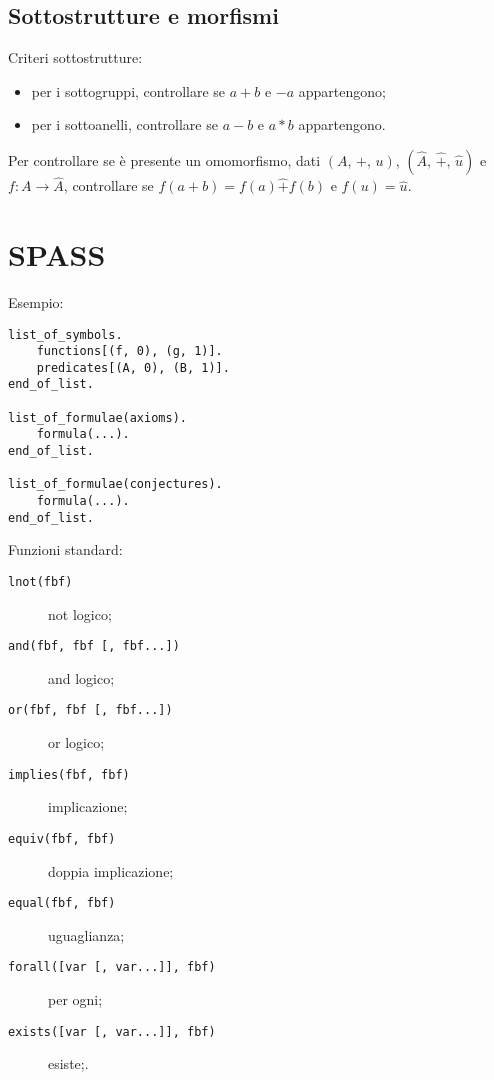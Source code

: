 \documentclass[10pt]{article}
\begin{document}
        \subsection*{Sottostrutture e morfismi}

            Criteri sottostrutture:
            \begin{itemize}
                \item per i sottogruppi, controllare se \(a + b\) e \(-a\) appartengono;
                \item per i sottoanelli, controllare se \(a - b\) e \(a * b\) appartengono.
            \end{itemize}

            Per controllare se è presente un omomorfismo, dati \((A, \, +, \, u)\), \((\hat{A}, \, \hat{+}, \, \hat{u})\) e
            \(f : A \to \hat{A}\), controllare se \(f(a + b) = f(a) \hat{+} f(b)\) e \(f(u) = \hat{u}\).

    \section*{SPASS}

            \begin{minipage}[h]{.4\textwidth}
                Esempio:
                \begin{verbatim}
list_of_symbols.
    functions[(f, 0), (g, 1)].
    predicates[(A, 0), (B, 1)].
end_of_list.

list_of_formulae(axioms).
    formula(...).
end_of_list.

list_of_formulae(conjectures).
    formula(...).
end_of_list.
                \end{verbatim}
            \end{minipage}
            \begin{minipage}[h]{.6\textwidth}
                Funzioni standard:
                \begin{description}
                    \item[\texttt{lnot(fbf)}] not logico;
                    \item[\texttt{and(fbf, fbf [, fbf...])}] and logico;
                    \item[\texttt{or(fbf, fbf [, fbf...])}] or logico;
                    \item[\texttt{implies(fbf, fbf)}] implicazione;
                    \item[\texttt{equiv(fbf, fbf)}] doppia implicazione;
                    \item[\texttt{equal(fbf, fbf)}] uguaglianza;
                    \item[\texttt{forall([var [, var...]], fbf)}] per ogni;
                    \item[\texttt{exists([var [, var...]], fbf)}] esiste;.
                \end{description}
            \end{minipage}
\end{document}
